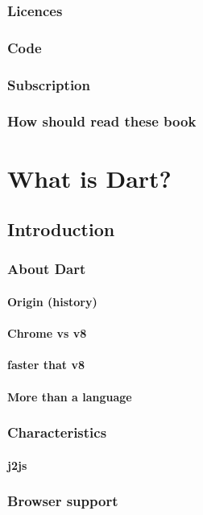 \documentclass[10pt]{book}
\begin{document}
\section{Licences}
\section{Code}
\section{Subscription}
\section{How should read these book}
%
\tableofcontents
%
\mainmatter
%
\part{What is Dart?}
\chapter{Introduction}
\section{About Dart}
\subsection{Origin  (history)}
\subsection{Chrome vs v8}
\subsection{faster that v8}
\subsection{More than a language}
\section{Characteristics}
\subsection{j2js}
\section{Browser support}
\end{document}
